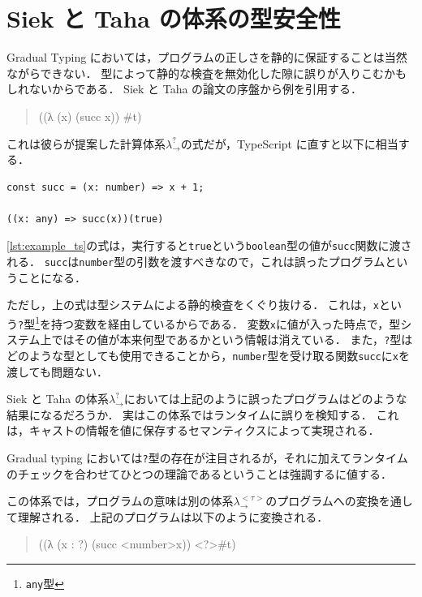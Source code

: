 \section{Siek と Taha の体系の型安全性}
\label{sec:safety_of_siek_taha}

Gradual Typing においては，プログラムの正しさを静的に保証することは当然ながらできない．
型によって静的な検査を無効化した隙に誤りが入りこむかもしれないからである．
Siek と Taha の論文の序盤から例を引用する．

\begin{quote}
    ((λ (x) (succ x)) \#t)
\end{quote}

これは彼らが提案した計算体系$\lambda^?_\to$の式だが，TypeScript に直すと以下に相当する．

\begin{lstlisting}[caption={TypeScript における例}, label={lst:example_ts}]
const succ = (x: number) => x + 1;

((x: any) => succ(x))(true)
\end{lstlisting}

\ref{lst:example_ts}の式は，実行すると\texttt{true}という\texttt{boolean}型の値が\texttt{succ}関数に渡される．
\texttt{succ}は\texttt{number}型の引数を渡すべきなので，これは誤ったプログラムということになる．

ただし，上の式は型システムによる静的検査をくぐり抜ける．
これは，\texttt{x}という\texttt{?}型\footnote{\texttt{any}型}を持つ変数を経由しているからである．
変数\texttt{x}に値が入った時点で，型システム上ではその値が本来何型であるかという情報は消えている．
また，\texttt{?}型はどのような型としても使用できることから，\texttt{number}型を受け取る関数\texttt{succ}に\texttt{x}を渡しても問題ない．

Siek と Taha の体系$\lambda^?_\to$においては上記のように誤ったプログラムはどのような結果になるだろうか．
実はこの体系ではランタイムに誤りを検知する．
これは，キャストの情報を値に保存するセマンティクスによって実現される．

Gradual typing においては\texttt{?}型の存在が注目されるが，それに加えてランタイムのチェックを合わせてひとつの理論であるということは強調するに値する．

この体系では，プログラムの意味は別の体系$\lambda^{<\tau>}_\to$のプログラムへの変換を通して理解される．
上記のプログラムは以下のように変換される．

\begin{quote}
    ((λ (x : ?) (succ <number>x)) <?>\#t)
\end{quote}

